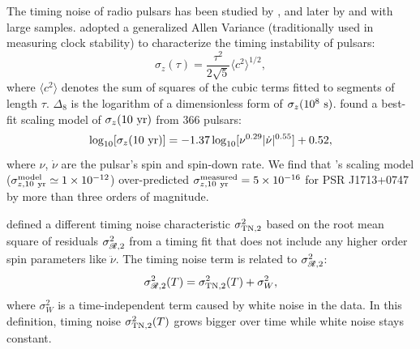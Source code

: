 The timing noise of radio pulsars has been studied by
\citet{ch80,cd85,antt94,dmhd95, mtem97}, and later by \citet{hlk10} and
\citet{sc10} with large samples. 
\citet{mtem97} adopted a generalized Allen Variance (traditionally used in
measuring clock stability) to characterize the timing instability of pulsars:
\begin{equation}
\label{eq:sigmaz}
\sigma_z(\tau) = \frac{\tau^2}{2\sqrt{5}}\langle c^2 \rangle^{1/2},
\end{equation}
where $\langle c^2\rangle$ denotes the sum of squares of the cubic
terms fitted to segments of length $\tau$. 
$\Delta_8$ is the logarithm of a dimensionless form of $\sigma_z(10^8~\rm s)$.
\citet{hlk10} found a best-fit scaling model of $\sigma_z({\rm 10~yr})$ 
from 366 pulsars:
\begin{equation}
\label{eq:hlk10}
\log_{10}[\sigma_z({\rm 10~yr})] =
-1.37\log_{10}[\nu^{0.29}|\dot{\nu}|^{0.55}]+0.52,
\end{equation} 
where $\nu$, $\dot{\nu}$ are the pulsar's spin and spin-down rate.
We find that \citet{hlk10}'s scaling model ($\sigma^{\rm model}_{z, \rm
10~yr}\simeq1\times10^{-12}$) over-predicted $\sigma^{\rm measured}_{z, \rm
10~yr}=5\times10^{-16}$ for PSR J1713+0747 by more than three orders of magnitude. 

\citet{ch80} defined a different timing noise characteristic $\sigma^2_{\rm
TN,2}$ based on the root mean square of residuals $\sigma^2_{\mathscr{R},2}$ from a
timing fit that does not include any higher order spin parameters like
$\ddot{\nu}$. 
The timing noise term is related to $\sigma^2_{\mathscr{R},2}$:
\begin{equation}
\sigma^2_{\msR,2}(T) = \sigma^2_{\rm TN,2}(T) + \sigma^2_W, 
\end{equation}
where $\sigma^2_W$ is a time-independent term caused by white 
noise in the data.
In this definition, timing noise $\sigma^2_{\rm TN,2}(T)$ grows bigger over
time while white noise stays constant.  

